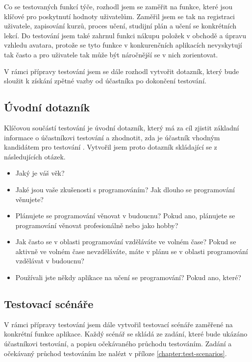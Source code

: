 Co se testovaných funkcí týče, rozhodl jsem se zaměřit na funkce, které jsou klíčové pro poskytnutí hodnoty uživatelům. Zaměřil jsem se tak na registraci uživatele, zapisování kurzů, proces učení, studijní plán a učení se konkrétních lekcí. Do testování jsem také zahrnul funkci nákupu položek v obchodě a úpravu vzhledu avatara, protože se tyto funkce v konkurenčních aplikacích nevyskytují tak často a pro uživatele tak může být náročnější se v nich zorientovat.

V rámci přípravy testování jsem se dále rozhodl vytvořit dotazník, který bude sloužit k získání zpětné vazby od účastníka po dokončení testování.

\subsection{Úvodní dotazník}

Klíčovou součástí testování je úvodní dotazník, který má za cíl zjistit základní informace o účastníkovi testování a zhodnotit, zda je účastník vhodným kandidátem pro testování \cite{NURUserInterfaceTesting}. Vytvořil jsem proto dotazník skládající se z následujících otázek.

\begin{itemize}
    \item Jaký je váš věk?
    \item Jaké jsou vaše zkušenosti s programováním? Jak dlouho se programování věnujete?
    \item Plánujete se programování věnovat v budoucnu? Pokud ano, plánujete se programování věnovat profesionálně nebo jako hobby?
    \item Jak často se v oblasti programování vzděláváte ve volném čase? Pokud se aktivně ve volném čase nevzděláváte, máte v plánu se v oblasti programování vzdělávat v budoucnu?
    \item Používali jste někdy aplikace na učení se programování? Pokud ano, které?
\end{itemize}

\subsection{Testovací scénáře}

V rámci přípravy testování jsem dále vytvořil testovací scénáře zaměřené na konkrétní funkce aplikace. Každý scénář se skládá ze zadání, které bude ukázáno účastníkovi testování, a popisu očekávaného průchodu testováním. Zadání a očekávaný průchod testováním lze nalézt v příloze \ref{chapter:test-scenarios}.

